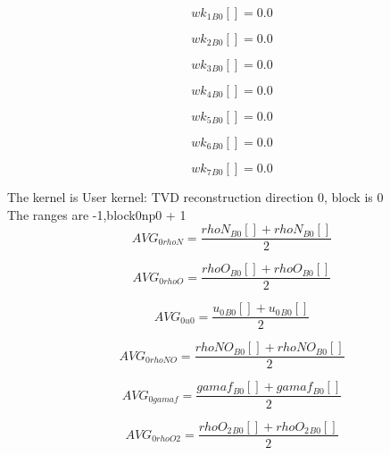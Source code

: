 \documentclass{article}
\begin{document}
\begin{dmath}{wk_{1}{_{B0}}}[{}] = 0.0\end{dmath}

\begin{dmath}{wk_{2}{_{B0}}}[{}] = 0.0\end{dmath}

\begin{dmath}{wk_{3}{_{B0}}}[{}] = 0.0\end{dmath}

\begin{dmath}{wk_{4}{_{B0}}}[{}] = 0.0\end{dmath}

\begin{dmath}{wk_{5}{_{B0}}}[{}] = 0.0\end{dmath}

\begin{dmath}{wk_{6}{_{B0}}}[{}] = 0.0\end{dmath}

\begin{dmath}{wk_{7}{_{B0}}}[{}] = 0.0\end{dmath}

\noindent The kernel is User kernel: TVD reconstruction direction 0, block is 0\\\noindent The ranges are -1,block0np0 + 1\\\begin{dmath}AVG_{0 rhoN} = \frac{{rhoN{_{B0}}}[{}] + {rhoN{_{B0}}}[{}]}{2}\end{dmath}

\begin{dmath}AVG_{0 rhoO} = \frac{{rhoO{_{B0}}}[{}] + {rhoO{_{B0}}}[{}]}{2}\end{dmath}

\begin{dmath}AVG_{0 u0} = \frac{{u_{0}{_{B0}}}[{}] + {u_{0}{_{B0}}}[{}]}{2}\end{dmath}

\begin{dmath}AVG_{0 rhoNO} = \frac{{rhoNO{_{B0}}}[{}] + {rhoNO{_{B0}}}[{}]}{2}\end{dmath}

\begin{dmath}AVG_{0 gamaf} = \frac{{gamaf{_{B0}}}[{}] + {gamaf{_{B0}}}[{}]}{2}\end{dmath}

\begin{dmath}AVG_{0 rhoO2} = \frac{{rhoO_{2}{_{B0}}}[{}] + {rhoO_{2}{_{B0}}}[{}]}{2}\end{dmath}
\end{document}
